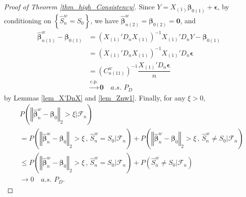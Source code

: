 \documentclass[ejs,authoryear,linksfromyear]{imsart}
\newcommand{\CONV}[1]{\stackrel{\text{#1}}{\longrightarrow}} %
\newcommand{\bnw}{\widehat{\bm{\beta}}_n^w} %
\newcommand{\bnwa}{\widehat{\bm{\beta}}_{n(1)}^w}
\newcommand{\cnwa}{C_{n(11)}^w}
\numberwithin{equation}{section}
\theoremstyle{plain}
\begin{document}
\begin{proof}[Proof of Theorem \ref{thm_high_Consistency}]
 	Since $Y = X_{(1)} \bm{\beta}_{0(1)} + \bm{\epsilon}$, by conditioning on $\left\{ \widehat{S}_n^w = S_0 \right\}$, we have $\widehat{\bm{\beta}}^w_{n(2)} = \bm{\beta}_{0(2)} = \bm{0}$, and
	\begin{align*}
	\bnwa - \bm{\beta}_{0(1)} 
	&= \left(
	X_{(1)}' D_n X_{(1)} 
	\right)^{-1} X_{(1)}' D_n Y
	- \bm{\beta}_{0(1)} \\
	&= \left(
	X_{(1)}' D_n X_{(1)} 
	\right)^{-1} X_{(1)}' 
	D_n \bm{\epsilon} \\
	&= \left(
		\cnwa
	\right)^{-1}
	\dfrac{X_{(1)}' D_n \bm{\epsilon}}{n} \\
	&\CONV{c.p.} \bm{0} \quad a.s. \,\, P_D
	\end{align*}
by Lemmas \ref{lem_X'DnX} and \ref{lem_Znw1}. Finally, for any $\xi > 0$,
	\begin{align*}
	&P \left(
		\left\Vert
			\bnw - \bm{\beta}_0
		\right\Vert_2
		> \xi
	\Big| \mathcal{F}_n
	\right) \\
	&= P \left(
	\left\Vert
	\bnw - \bm{\beta}_0
	\right\Vert_2
	> \xi \, , \, 
	\widehat{S}_n^w = S_0
	\Big| \mathcal{F}_n
	\right)
	+ P \left(
		\left\Vert
			\bnw - \bm{\beta}_0
		\right\Vert_2
		> \xi \, , \, 
		\widehat{S}_n^w \neq S_0
		\Big| \mathcal{F}_n
	\right) \\
	&\leq P \left(
	\left\Vert
	\bnw - \bm{\beta}_0
	\right\Vert_2
	> \xi \, , \, 
	\widehat{S}_n^w = S_0
	\Big| \mathcal{F}_n
	\right)
	+ P \left(
		\widehat{S}_n^w \neq S_0
	\big| \mathcal{F}_n
	\right) \\
	&\to 0 \quad a.s. \,\, P_D.  
	\end{align*}
\end{proof}
\end{document}
